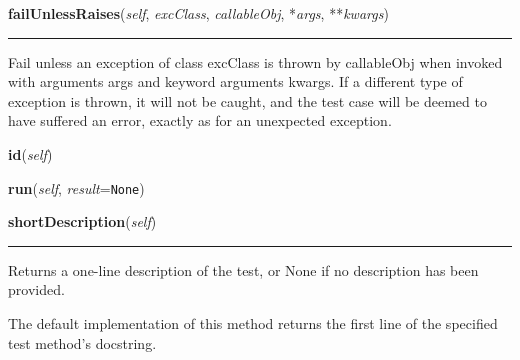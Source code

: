     \begin{boxedminipage}{\textwidth}

    \raggedright \textbf{failUnlessRaises}(\textit{self}, \textit{excClass}, \textit{callableObj}, *\textit{args}, **\textit{kwargs})

    \vspace{-1.5ex}

    \rule{\textwidth}{0.5\fboxrule}
    Fail unless an exception of class excClass is thrown by callableObj 
    when invoked with arguments args and keyword arguments kwargs. If a 
    different type of exception is thrown, it will not be caught, and the 
    test case will be deemed to have suffered an error, exactly as for an 
    unexpected exception.

    \vspace{1ex}

    \end{boxedminipage}

    \label{unittest:TestCase:id}

    \vspace{0.5ex}

    \begin{boxedminipage}{\textwidth}

    \raggedright \textbf{id}(\textit{self})

    \end{boxedminipage}

    \label{unittest:TestCase:run}

    \vspace{0.5ex}

    \begin{boxedminipage}{\textwidth}

    \raggedright \textbf{run}(\textit{self}, \textit{result}=\texttt{None})

    \end{boxedminipage}

    \label{unittest:TestCase:shortDescription}

    \vspace{0.5ex}

    \begin{boxedminipage}{\textwidth}

    \raggedright \textbf{shortDescription}(\textit{self})

    \vspace{-1.5ex}

    \rule{\textwidth}{0.5\fboxrule}
    Returns a one-line description of the test, or None if no description 
    has been provided.

    The default implementation of this method returns the first line of the
    specified test method's docstring.

    \vspace{1ex}

    \end{boxedminipage}

